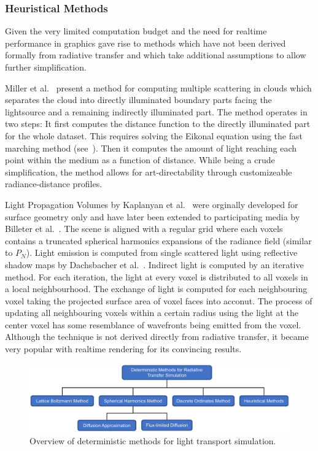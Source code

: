 \subsubsection*{Heuristical Methods}

Given the very limited computation budget and the need for realtime performance in graphics gave rise to methods which have not been derived formally from radiative transfer and which take additional assumptions to allow further simplification.

Miller et al.~\cite{Miller12} present a method for computing multiple scattering in clouds which separates the cloud into directly illuminated boundary parts facing the lightsource and a remaining indirectly illuminated part. The method operates in two steps: It first computes the distance function to the directly illuminated part for the whole dataset. This requires solving the Eikonal equation using the fast marching method (see~\cite{Tsitsiklis95}). Then it computes the amount of light reaching each point within the medium as a function of distance. While being a crude simplification, the method allows for art-directability through customizeable radiance-distance profiles.

Light Propagation Volumes by Kaplanyan et al.~\cite{Kaplanyan10} were orginally developed for surface geometry only and have later been extended to participating media by Billeter et al.~\cite{Billeter12}. The scene is aligned with a regular grid where each voxels contains a truncated spherical harmonics expansions of the radiance field (similar to $P_N$). Light emission is computed from single scattered light using reflective shadow maps by Dachsbacher et al.~\cite{Dachsbacher05}. Indirect light is computed by an iterative method. For each iteration, the light at every voxel is distributed to all voxels in a local neighbourhood. The exchange of light is computed for each neighbouring voxel taking the projected surface area of voxel faces into acconut. The process of updating all neighbouring voxels within a certain radius using the light at the center voxel has some resemblance of wavefronts being emitted from the voxel. Although the technique is not derived directly from radiative transfer, it became very popular with realtime rendering for its convincing results.


\begin{figure}[t]
\centering
\includegraphics[width=1.0\textwidth]{03_foundations_of_light_transport_simulation/figures/fig_overview_methods.pdf}
\caption{Overview of deterministic methods for light transport simulation.}
\label{fig:rte_change_L_all}
\end{figure}

